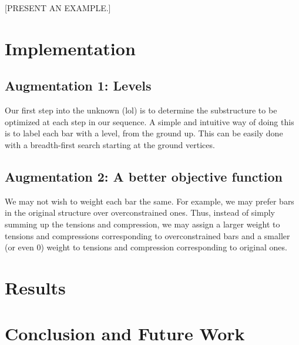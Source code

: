 \documentclass[11pt]{article}
\theoremstyle{definition}
\begin{document}
[PRESENT AN EXAMPLE.]

\section{Implementation}

\subsection{Augmentation 1: Levels}
Our first step into the unknown (lol) is to determine the substructure to be
optimized at each step in our sequence. A simple and intuitive way of doing this
is to label each bar with a level, from the ground up. This can be easily done
with a breadth-first search starting at the ground vertices.

\subsection{Augmentation 2: A better objective function}
We may not wish to weight each bar the same. For example, we may prefer bars in
the original structure over overconstrained ones. Thus, instead of simply
summing up the tensions and compression, we may assign a larger weight to
tensions and compressions corresponding to overconstrained bars and a smaller
(or even $0$) weight to tensions and compression corresponding to original ones.

\section{Results}

\section{Conclusion and Future Work}
\end{document}
